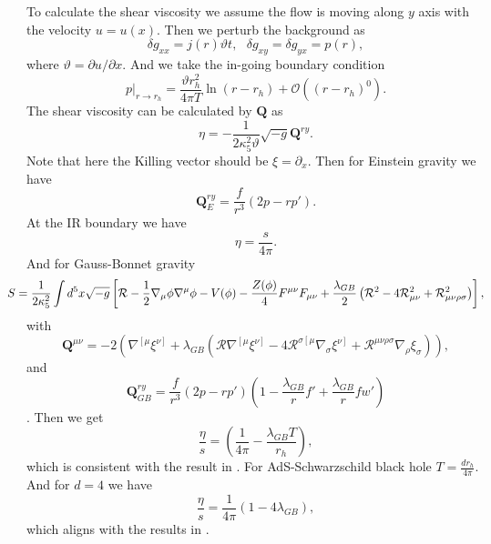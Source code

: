 \documentclass[a4paper,12pt]{article}
\numberwithin{equation}{section}
\begin{document}
To calculate the shear viscosity we assume the flow is moving along $y$ axis with the velocity $u=u(x)$. Then we perturb the background as
\begin{equation}
    \delta g_{xx}=j(r) \vartheta t ,~~~\delta g_{xy}=\delta g_{yx}=p(r),
\end{equation}
where $\vartheta=\partial u/\partial x$. And we take the in-going boundary condition \cite{Fan:2018qnt}
\begin{equation}
   \left. p\right|_{r\rightarrow r_h}=\frac{\vartheta r_h^2}{4\pi T}\ln(r-r_h)+\mathcal{O}(( r-r_h )^0).
\end{equation}
The shear viscosity can be calculated by $\mathbf{Q}$ as \cite{Fan:2018qnt}
\begin{equation}
    \eta = -\frac{1}{2\kappa_5^2\vartheta}\sqrt{-g} \mathbf{Q}^{ry}.
\end{equation}
Note that here the Killing vector should be $\xi=\partial_x$. Then for Einstein gravity we have 
\begin{equation}
    \mathbf{Q}^{ry}_{E}= \frac{f}{r^3}\left( 2p-rp' \right) .
\end{equation}
At the IR boundary we have
\begin{equation}
    \eta=\frac{s}{4\pi}.
\end{equation}
And for Gauss-Bonnet gravity 
\begin{equation}
   \hspace{-0.6cm} S=\frac{1}{2\kappa_5^2}\int d^5x \sqrt{-g}\left[\mathcal{R}-\frac{1}{2}\nabla_{\mu}\phi\nabla^{\mu}\phi-V(\phi)-\frac{Z(\phi)}{4}F^{\mu\nu}F_{\mu\nu}+\frac{\lambda_{GB}}{2} \left( \mathcal{R}^2-4\mathcal{R}_{\mu\nu}^2+\mathcal{R}_{\mu\nu\rho\sigma}^2 \right)\right],
\end{equation}
with \cite{Fan:2014ala,Chen:2016qks,Fan:2018qnt}
\begin{equation}
    \mathbf{Q}^{\mu\nu}=-2\left( \nabla^{\left[\mu\right.}\xi^{\left.\nu\right]} +\lambda_{GB}\left( \mathcal{R} \nabla^{\left[\mu\right.}\xi^{\left.\nu\right]}  -4\mathcal{R}^{\sigma \left[ \mu \right.}\nabla_{\sigma}\xi^{\left.\nu\right]}  +\mathcal{R}^{\mu\nu\rho\sigma} \nabla_\rho \xi_\sigma\right) \right),
\end{equation}
and
\begin{equation}
    \mathbf{Q}_{GB}^{ry}=\frac{f}{r^3}\left( 2p-rp' \right) \left( 1-\frac{\lambda_{GB}}{r}f'+\frac{\lambda_{GB}}{r} fw' \right)
\end{equation}.
Then we get
\begin{equation}
    \frac{\eta}{s}=\left( \frac{1}{4\pi}-\frac{\lambda_{GB}T}{r_h}  \right),
\end{equation}
which is consistent with the result in \cite{Charmousis:2012dw}.
For AdS-Schwarzschild black hole $T=\frac{d r_h}{4\pi}$. And for $d=4$ we have
\begin{equation}
    \frac{\eta}{s}=\frac{1}{4\pi}\left( 1-4\lambda_{GB}  \right),
\end{equation}
which aligns with the results in \cite{Brigante:2007nu}. 
\end{document}
